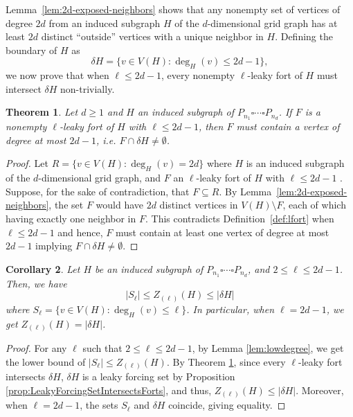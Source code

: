 \documentclass[11pt]{article}
\theoremstyle{plain} \newtheorem{question}{Question}
\newtheorem{thm}{Theorem}
\newtheorem{cor}[thm]{Corollary}
\theoremstyle{definition}
\begin{document}
Lemma~\ref{lem:2d-exposed-neighbors} shows that any nonempty set of vertices of degree $2d$ from an induced subgraph $H$ of the $d$-dimensional grid graph has at least $2d$ distinct ``outside'' vertices with a unique neighbor in $H$. Defining the boundary of $H$ as 
\[\delta H = \{v\in V(H) : \deg_H(v) \le 2d-1 \},\] we now prove that when $\ell\le 2d-1$, every nonempty $\ell$-leaky fort of $H$ must intersect $\delta H$ non-trivially. 

\begin{thm}\label{thm:lfort-hits-boundary-dgrid}
Let $d\ge 1$ and $H$ an induced subgraph of $P_{n_1}\square\cdots\square P_{n_d}$. If $F$ is a \emph{nonempty}
$\ell$-leaky fort of $H$ with $\ell\le 2d-1$, then $F$ must contain a vertex of degree at most $2d-1$, i.e. $F \cap \delta H\neq \emptyset$.
\end{thm}

\begin{proof}
Let $R=\{v\in V(H):\deg_H(v)=2d\}$ where $H$ is an induced subgraph of the $d$-dimensional grid graph, and $F$ an $\ell$-leaky fort of $H$ with $\ell\le 2d-1$ . Suppose, for the sake of contradiction, that $F\subseteq R$. By Lemma~\ref{lem:2d-exposed-neighbors},
the set $F$ would have $2d$ distinct vertices in $V(H)\setminus F$, each of which having exactly one neighbor in $F$. This contradicts
Definition~\ref{def:lfort} when $\ell\le 2d-1$ and hence, $F$ must contain at least one vertex of degree at most $2d-1$ implying $F\cap \delta H \ne \emptyset$.
\end{proof}



\begin{cor}\label{cor:LeakyForcingBoundaryEquality}
    Let $H$ be an induced subgraph of $P_{n_1}\square \cdots \square P_{n_d}$, and $2\le \ell \le 2d-1$. Then, we have 
    \[ |S_\ell| \le Z_{(\ell)}(H) \le |\delta H|\]
    where $S_\ell = \{v\in V(H) : \deg_H(v) \le \ell\}$. In particular, when $\ell = 2d-1$, we get $Z_{(\ell)}(H) = |\delta H|$. 
\end{cor}

\begin{proof}
    For any $\ell$ such that $2\le \ell \le 2d-1$, by Lemma \ref{lem:lowdegree}, we get the lower bound of $|S_{\ell}|\le Z_{(\ell)}(H)$. By Theorem \ref{thm:lfort-hits-boundary-dgrid}, since every $\ell$-leaky fort intersects $\delta H$, $\delta H$ is a leaky forcing set by Proposition \ref{prop:LeakyForcingSetIntersectsForts}, and thus, $Z_{(\ell)}(H)\le |\delta H|$. Moreover, when $\ell = 2d-1$, the sets $S_{\ell}$ and $\delta H$ coincide, giving equality. 
\end{proof}
\end{document}
